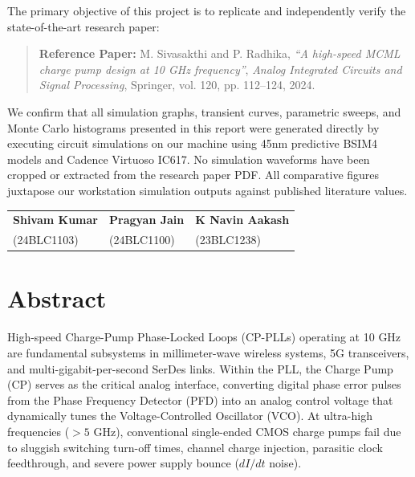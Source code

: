 \documentclass[11pt,a4paper]{report}
\begin{document}
The primary objective of this project is to replicate and independently verify the state-of-the-art research paper:
\begin{quote}
\textbf{Reference Paper:} M. Sivasakthi and P. Radhika, \textit{``A high-speed MCML charge pump design at 10 GHz frequency''}, \textit{Analog Integrated Circuits and Signal Processing}, Springer, vol. 120, pp. 112--124, 2024.
\end{quote}

We confirm that all simulation graphs, transient curves, parametric sweeps, and Monte Carlo histograms presented in this report were generated directly by executing circuit simulations on our machine using 45nm predictive BSIM4 models and Cadence Virtuoso IC617. No simulation waveforms have been cropped or extracted from the research paper PDF. All comparative figures juxtapose our workstation simulation outputs against published literature values.

\vspace{2.5cm}
\noindent
\begin{tabularx}{\textwidth}{XXX}
\textbf{Shivam Kumar} & \textbf{Pragyan Jain} & \textbf{K Navin Aakash} \\
(24BLC1103) & (24BLC1100) & (23BLC1238)
\end{tabularx}

\newpage

\chapter*{Abstract}

High-speed Charge-Pump Phase-Locked Loops (CP-PLLs) operating at 10 GHz are fundamental subsystems in millimeter-wave wireless systems, 5G transceivers, and multi-gigabit-per-second SerDes links. Within the PLL, the Charge Pump (CP) serves as the critical analog interface, converting digital phase error pulses from the Phase Frequency Detector (PFD) into an analog control voltage that dynamically tunes the Voltage-Controlled Oscillator (VCO). At ultra-high frequencies ($>5\text{ GHz}$), conventional single-ended CMOS charge pumps fail due to sluggish switching turn-off times, channel charge injection, parasitic clock feedthrough, and severe power supply bounce ($dI/dt$ noise).
\end{document}
